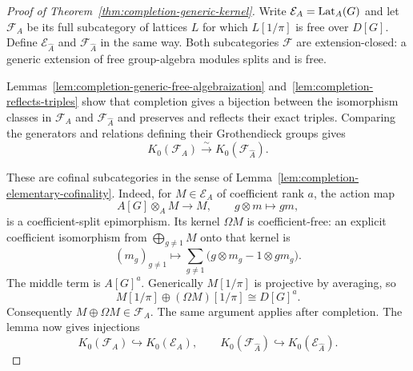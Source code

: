 \begin{proof}[Proof of Theorem~\ref{thm:completion-generic-kernel}]
Write $\mathcal E_A=\operatorname{Lat}_A(G)$ and let $\mathcal F_A$ be its
full subcategory of lattices $L$ for which $L[1/\pi]$ is free over
$D[G]$.  Define $\mathcal E_{\widehat A}$ and
$\mathcal F_{\widehat A}$ in the same way.  Both subcategories
$\mathcal F$ are extension-closed: a generic extension of free
group-algebra modules splits and is free.

Lemmas~\ref{lem:completion-generic-free-algebraization}
and~\ref{lem:completion-reflects-triples} show that completion
gives a bijection between the isomorphism classes in
$\mathcal F_A$ and $\mathcal F_{\widehat A}$ and preserves and
reflects their exact triples.  Comparing the generators and
relations defining their Grothendieck groups gives
\begin{equation}\label{eq:completion-free-subcategory-kzero}
 K_0(\mathcal F_A)\xrightarrow{\sim}
 K_0(\mathcal F_{\widehat A}).
\end{equation}

These are cofinal subcategories in the sense of
Lemma~\ref{lem:completion-elementary-cofinality}.  Indeed, for
$M\in\mathcal E_A$ of coefficient rank $a$, the action map
\[
 A[G]\otimes_A M\longrightarrow M,
 \qquad g\otimes m\longmapsto gm,
\]
is a coefficient-split epimorphism.  Its kernel $\Omega M$ is
coefficient-free: an explicit coefficient isomorphism from
$\bigoplus_{g\ne1}M$ onto that kernel is
\[
 (m_g)_{g\ne1}\longmapsto
 \sum_{g\ne1}\bigl(g\otimes m_g-1\otimes gm_g\bigr).
\]
The middle term is $A[G]^a$.  Generically $M[1/\pi]$ is projective
by averaging, so
\[
 M[1/\pi]\oplus(\Omega M)[1/\pi]\cong D[G]^a.
\]
Consequently $M\oplus\Omega M\in\mathcal F_A$.  The same
argument applies after completion.  The lemma now gives
injections
\begin{equation}\label{eq:completion-cofinal-injections}
 K_0(\mathcal F_A)\hookrightarrow K_0(\mathcal E_A),\qquad
 K_0(\mathcal F_{\widehat A})\hookrightarrow
                         K_0(\mathcal E_{\widehat A}).
\end{equation}


\end{proof}
